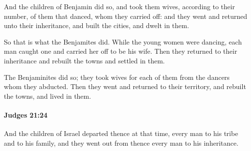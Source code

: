 			\begin{versebox}
					\item[BHS] 
					\item[ASV] And the children of Benjamin did so, and took them wives, according to their number, of them that danced, whom they carried off: and they went and returned unto their inheritance, and built the cities, and dwelt in them.
					\item[NIV] So that is what the Benjamites did. While the young women were dancing, each man caught one and carried her off to be his wife. Then they returned to their inheritance and rebuilt the towns and settled in them.
					\item[NRSV] The Benjaminites did so; they took wives for each of them from the dancers whom they abducted. Then they went and returned to their territory, and rebuilt the towns, and lived in them.
			\end{versebox}

		\paragraph{Judges 21:24} %
			\label{JUDGES-21-24}

			And the children of Israel departed thence at that time, every man to his tribe and to his family, and they went out from thence every man to his inheritance.

